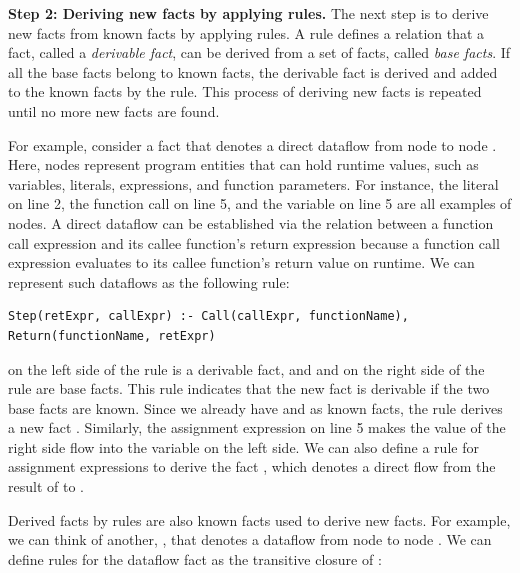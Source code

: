 \smallskip
\textbf{Step 2: Deriving new facts by applying rules.}
The next step is to derive new facts from known facts by applying rules.  A
rule defines a relation that a fact, called a {\it derivable fact}, can be
derived from a set of facts, called {\it base facts}.  If all the base facts
belong to known facts, the derivable fact is derived and added to the known
facts by the rule.  This process of deriving new facts is repeated until no
more new facts are found.


For example, consider a fact  that denotes a direct dataflow
from node  to node .  Here, nodes represent
program entities that can hold runtime values, such as variables, literals,
expressions, and function parameters.  For instance, the literal  on
line 2, the function call  on line 5, and the variable  on
line 5 are all examples of nodes.
%
A direct dataflow can be established via the relation between a function call
expression and its callee function's return expression because a function call
expression evaluates to its callee function's return value on runtime.  We can
represent such dataflows as the following rule:
\begin{lstlisting}[style=mrule]
Step(retExpr, callExpr) :- Call(callExpr, functionName), Return(functionName, retExpr)
\end{lstlisting}

\noindent
{} on the left side of the rule is a derivable
fact, and  and  on the right side of the rule are base facts.  This rule indicates
that the new fact  is derivable if the two base
facts are known.  Since we already have  and  as known facts, the rule derives a new fact . Similarly, the assignment expression on line 5
makes the value of the right side flow into the variable on the left side.
We can also define a rule for assignment expressions
to derive the fact , which denotes a direct flow
from the result of  to .

Derived facts by rules are also known facts used to derive new facts.  For
example, we can think of another, , that denotes a dataflow
from node  to node .  We can define rules for the dataflow
fact as the transitive closure of :

